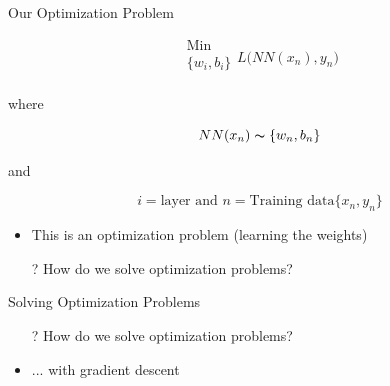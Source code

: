 \documentclass[aspectratio=169]{beamer}
\begin{document}
\begin{frame}{Our Optimization Problem}

$$\begin{matrix} {\textrm{Min}}\\{\{w_i, b_i\}}\\ \end{matrix} L\big( NN(x_n), y_n\big)$$

\centerline{where}
$$NN(x_n) \thicksim \{w_n, b_n\} $$

\centerline{and}

$$i = \textrm{layer and } n= \textrm{Training data}\{x_n, y_n\}$$

\begin{itemize}
\item This is an optimization problem (learning the weights)
\item[?] How do we solve optimization problems?
\end{itemize}
\end{frame}
\begin{frame}{Solving Optimization Problems}

\begin{itemize}
\item[?] How do we solve optimization problems?
\item ... with gradient descent
\end{itemize}
\end{frame}
\end{document}

